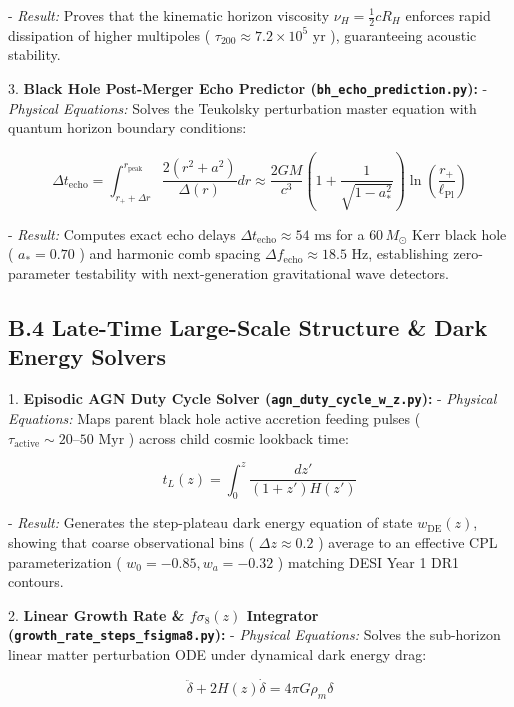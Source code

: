 \documentclass[11pt,a4paper]{article}
\theoremstyle{definition}\newtheorem{definition}{Definition}
\theoremstyle{remark}\newtheorem{remark}{Remark}
\begin{document}
- \textit{Result:} Proves that the kinematic horizon viscosity $\nu_H = \frac{1}{2} c R_H$ enforces rapid dissipation of higher multipoles ( $\tau_{200} \approx 7.2 \times 10^5\text{ yr}$ ), guaranteeing acoustic stability.

3. \textbf{Black Hole Post-Merger Echo Predictor (\texttt{bh_echo_prediction.py}):}
- \textit{Physical Equations:} Solves the Teukolsky perturbation master equation with quantum horizon boundary conditions:


\begin{equation}
\Delta t_{\text{echo}} = \int_{r_+ + \Delta r}^{r_{\text{peak}}} \frac{2(r^2 + a^2)}{\Delta(r)} dr \approx \frac{2GM}{c^3} \left( 1 + \frac{1}{\sqrt{1-a_*^2}} \right) \ln\left( \frac{r_+}{\ell_{\text{Pl}}} \right)
\end{equation}


- \textit{Result:} Computes exact echo delays $\Delta t_{\text{echo}} \approx 54\text{ ms}$ for a $60\,M_\odot$ Kerr black hole ( $a_* = 0.70$ ) and harmonic comb spacing $\Delta f_{\text{echo}} \approx 18.5\text{ Hz}$, establishing zero-parameter testability with next-generation gravitational wave detectors.
\subsection{B.4 Late-Time Large-Scale Structure \& Dark Energy Solvers}

1. \textbf{Episodic AGN Duty Cycle Solver (\texttt{agn_duty_cycle_w_z.py}):}
- \textit{Physical Equations:} Maps parent black hole active accretion feeding pulses ( $\tau_{\text{active}} \sim 20\text{--}50\text{ Myr}$ ) across child cosmic lookback time:


\begin{equation}
t_L(z) = \int_0^z \frac{dz'}{(1+z')H(z')}
\end{equation}


- \textit{Result:} Generates the step-plateau dark energy equation of state $w_{\text{DE}}(z)$, showing that coarse observational bins ( $\Delta z \approx 0.2$ ) average to an effective CPL parameterization ( $w_0 = -0.85, w_a = -0.32$ ) matching DESI Year 1 DR1 contours.

2. \textbf{Linear Growth Rate \& $f\sigma_8(z)$ Integrator (\texttt{growth_rate_steps_fsigma8.py}):}
- \textit{Physical Equations:} Solves the sub-horizon linear matter perturbation ODE under dynamical dark energy drag:


\begin{equation}
\ddot{\delta} + 2H(z)\dot{\delta} = 4\pi G \rho_m \delta
\end{equation}
\end{document}
